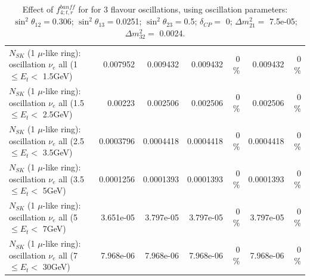 \begin{table}
\begin{tabular}{| l | r | r | r  r | r  r |}
$N_{SK}$ (1 $\mu$-like ring): oscillation $\nu_{e}$ all (1 $\leq E_{t} <$ 1.5GeV) &        0.007952 &        0.009432 &        0.009432 &        0 \%  &        0.009432 &        0 \%  \\ 
$N_{SK}$ (1 $\mu$-like ring): oscillation $\nu_{e}$ all (1.5 $\leq E_{t} <$ 2.5GeV) &         0.00223 &        0.002506 &        0.002506 &        0 \%  &        0.002506 &        0 \%  \\ 
$N_{SK}$ (1 $\mu$-like ring): oscillation $\nu_{e}$ all (2.5 $\leq E_{t} <$ 3.5GeV) &       0.0003796 &       0.0004418 &       0.0004418 &        0 \%  &       0.0004418 &        0 \%  \\ 
$N_{SK}$ (1 $\mu$-like ring): oscillation $\nu_{e}$ all (3.5 $\leq E_{t} <$ 5GeV) &       0.0001256 &       0.0001393 &       0.0001393 &        0 \%  &       0.0001393 &        0 \%  \\ 
 $N_{SK}$ (1 $\mu$-like ring): oscillation $\nu_{e}$ all (5 $\leq E_{t} <$ 7GeV) &       3.651e-05 &       3.797e-05 &       3.797e-05 &        0 \%  &       3.797e-05 &        0 \%  \\ 
$N_{SK}$ (1 $\mu$-like ring): oscillation $\nu_{e}$ all (7 $\leq E_{t} <$ 30GeV) &       7.968e-06 &       7.968e-06 &       7.968e-06 &        0 \%  &       7.968e-06 &        0 \%  \\ 
\hline
\hline
\end{tabular}
\caption{ Effect of $f_{4; t, r}^{banff}$ for for 3 flavour oscillations, using oscillation parameters:  $\sin^2\theta_{12} = $0.306; $\sin^2\theta_{13} = $0.0251; $\sin^2\theta_{23} = $0.5; $\delta_{CP} = $        0; $\Delta m^2_{21} = $    7.5e-05; $\Delta m^2_{32} = $    0.0024. }
\label{tab:num_banff_04_1RmuT_3f_osc_t13:0.0251}
\end{table}
\clearpage

